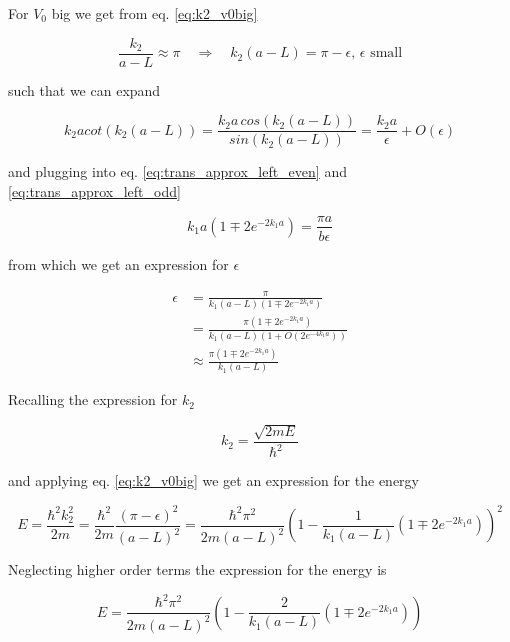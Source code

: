 \documentclass{article}
\begin{document}
For \(V_0\) big we get from eq. \eqref{eq:k2_v0big}

\begin{equation}
\frac{k_2}{a-L} \approx \pi \quad \Rightarrow \quad k_2(a-L) = \pi - \epsilon, \, \epsilon \text{ small}
\end{equation}

such that we can expand

\begin{equation}
k_2a cot(k_2(a-L)) = \frac{k_2a \, cos(k_2(a-L))}{sin(k_2(a-L))} = \frac{k_2a}{\epsilon} + O(\epsilon)
\end{equation}

and plugging into eq. \eqref{eq:trans_approx_left_even} and \eqref{eq:trans_approx_left_odd}

\begin{equation*}
k_1a \left(1 \mp 2e^{-2k_1a} \right) = \frac{\pi a}{b \epsilon}
\end{equation*}

from which we get an expression for \(\epsilon\)

\begin{align}
\epsilon & = \frac{\pi}{k_1(a-L)\left(1 \mp 2e^{-2k_1a} \right)} \nonumber \\
& = \frac{\pi \left(1 \mp 2e^{-2k_1a} \right)}{k_1(a-L)\left(1 + O\left(2e^{-4k_1a} \right) \right)} \nonumber \\
& \approx \frac{\pi \left(1 \mp 2e^{-2k_1a} \right)}{k_1(a-L)}
\end{align}

Recalling the expression for \(k_2\)

\begin{equation*}
k_2 = \frac{\sqrt{2mE}}{\hbar^2}
\end{equation*}

and applying eq. \eqref{eq:k2_v0big} we get an expression for the energy

\begin{equation}
E = \frac{\hbar^2 k_2^2}{2m} = \frac{\hbar^2}{2m} \frac{(\pi - \epsilon)^2}{(a-L)^2} = \frac{\hbar^2 \pi^2}{2m(a-L)^2} \left(1 - \frac{1}{k_1(a-L)} \left( 1 \mp 2e^{-2k_1a} \right) \right)^2
\end{equation}

Neglecting higher order terms the expression for the energy is

\begin{equation}
E = \frac{\hbar^2 \pi^2}{2m(a-L)^2} \left(1 - \frac{2}{k_1(a-L)} \left( 1 \mp 2e^{-2k_1a} \right) \right)
\end{equation}
\end{document}
